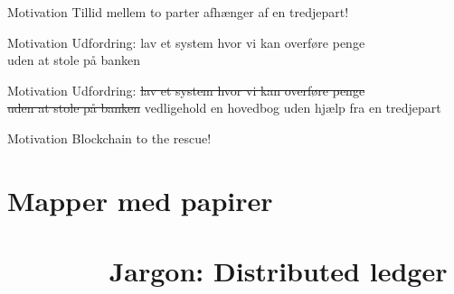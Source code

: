 \documentclass[usenames, dvipsnames]{beamer}
\begin{document}
  \begin{frame}{Motivation}
    \center Tillid mellem to parter afhænger af en \textcolor{RubineRed}{tredjepart}!
  \end{frame}
  \begin{frame}{Motivation}
      \center \textcolor{BrickRed}{Udfordring}:
      \center lav et system hvor vi kan overføre penge \\ uden at stole på banken
  \end{frame}
  \begin{frame}{Motivation}
      \center \textcolor{BrickRed}{Udfordring}:
      \center \sout{lav et system hvor vi kan overføre penge \\ uden at stole på banken}
      \center vedligehold en hovedbog uden hjælp fra en tredjepart
  \end{frame}
  \begin{frame}{Motivation}
      \center \textcolor{Dandelion}{Blockchain} to the rescue!
  \end{frame}
  \section{Mapper med papirer \ \ \ \ \ \ \ \ \ \ \ \ \ \ \ \ \ \ \ \ \ \ \ \ \ \ \ \ \ \ \ \ \ \ \ \ \ \ \small Jargon: Distributed ledger}
\end{document}
